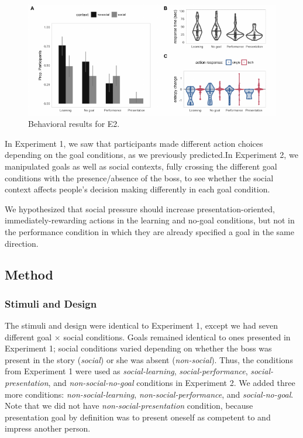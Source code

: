 \documentclass[10pt, letterpaper]{article}
\newenvironment{CodeChunk}{}{}
\begin{document}
\begin{CodeChunk}
\begin{figure}[tb]

{\centering \includegraphics[width=0.95\linewidth]{figs/e2_behav_results-1} 

}

\caption[Behavioral results for E2]{Behavioral results for E2.}\label{fig:e2_behav_results}
\end{figure}
\end{CodeChunk}

In Experiment 1, we saw that participants made different action choices
depending on the goal conditions, as we previously predicted.In
Experiment 2, we manipulated goals as well as social contexts, fully
crossing the different goal conditions with the presence/absence of the
boss, to see whether the social context affects people's decision making
differently in each goal condition.

We hypothesized that social pressure should increase
presentation-oriented, immediately-rewarding actions in the learning and
no-goal conditions, but not in the performance condition in which they
are already specified a goal in the same direction.

\subsection{Method}\label{method-1}

\subsubsection{Stimuli and Design}\label{stimuli-and-design-1}

The stimuli and design were identical to Experiment 1, except we had
seven different goal \(\times\) social conditions. Goals remained
identical to ones presented in Experiment 1; social conditions varied
depending on whether the boss was present in the story (\emph{social})
or she was absent (\emph{non-social}). Thus, the conditions from
Experiment 1 were used as \emph{social-learning},
\emph{social-performance}, \emph{social-presentation}, and
\emph{non-social-no-goal} conditions in Experiment 2. We added three
more conditions: \emph{non-social-learning},
\emph{non-social-performance}, and \emph{social-no-goal}. Note that we
did not have \emph{non-social-presentation} condition, because
presentation goal by definition was to present oneself as competent to
and impress another person.
\end{document}
